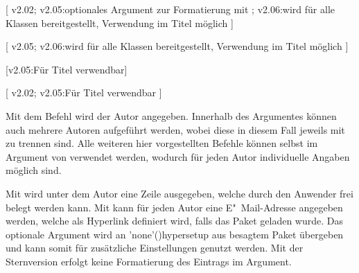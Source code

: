 \begin{DeclareEntity*}{}
\begin{DeclareEntity*}{}
\begin{DeclareEntity*}{}
\begin{Declaration}
  {}
\begin{Declaration}
  {}
\begin{Declaration}
  {}
[%
  v2.02;%
  v2.05:optionales Argument zur Formatierung mit ;%
  v2.06:wird für alle Klassen bereitgestellt, Verwendung im Titel möglich%
]
\begin{Declaration}
  {}
[%
  v2.05;%
  v2.06:wird für alle Klassen bereitgestellt, Verwendung im Titel möglich%
]
\begin{Declaration}
  {}
\begin{Declaration}
  {}
\begin{Declaration}
  {}
\begin{Declaration}
  {}
\begin{Declaration}
  {}
  [v2.05:Für Titel verwendbar]
\begin{Declaration}
  {}
[%
  v2.02;%
  v2.05:Für Titel verwendbar%
]

Mit dem Befehl  wird der Autor angegeben. Innerhalb des 
Argumentes können auch mehrere Autoren aufgeführt werden, wobei diese in diesem 
Fall jeweils mit  zu trennen sind. Alle weiteren hier vorgestellten 
Befehle können selbst im Argument von  verwendet werden, wodurch 
für jeden Autor individuelle Angaben möglich sind.

Mit  wird unter dem Autor eine Zeile ausgegeben, welche 
durch den Anwender frei belegt werden kann. Mit  kann für 
jeden Autor eine E"~Mail-Adresse angegeben werden, welche als Hyperlink
definiert wird, falls das Paket  geladen wurde. Das optionale 
Argument wird an \Macro'none'(){hypersetup} aus besagtem
Paket übergeben und kann somit für zusätzliche Einstellungen genutzt werden. 
Mit der Sternversion  erfolgt keine Formatierung des 
Eintrags im Argument.


\end{Declaration}
\end{Declaration}
\end{Declaration}
\end{Declaration}
\end{Declaration}
\end{Declaration}
\end{Declaration}
\end{Declaration}
\end{Declaration}
\end{Declaration}
\end{DeclareEntity*}
\end{DeclareEntity*}
\end{DeclareEntity*}
